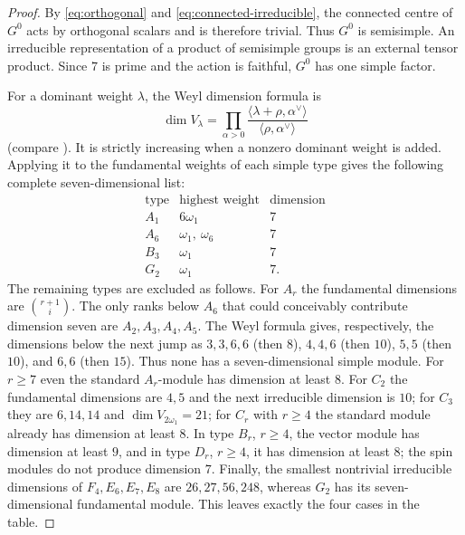 \begin{proof}
By \eqref{eq:orthogonal} and \eqref{eq:connected-irreducible}, the connected
centre of $G^0$ acts by orthogonal scalars and is therefore trivial.  Thus
$G^0$ is semisimple.  An irreducible representation of a product of
semisimple groups is an external tensor product.  Since $7$ is prime and the
action is faithful, $G^0$ has one simple factor.

For a dominant weight $\lambda$, the Weyl dimension formula is
\[
 \dim V_\lambda=
 \prod_{\alpha>0}
 \frac{\langle\lambda+\rho,\alpha^\vee\rangle}
      {\langle\rho,\alpha^\vee\rangle}
\]
(compare \cite[Lecture~24]{FultonHarris1991}).  It is strictly increasing when a nonzero
dominant weight is added.  Applying it to the fundamental weights of each
simple type gives the following complete seven-dimensional list:
\[
\begin{array}{c|c|c}
\text{type}&\text{highest weight}&\text{dimension}\\ \hline
A_1&6\omega_1&7\\
A_6&\omega_1,\ \omega_6&7\\
B_3&\omega_1&7\\
G_2&\omega_1&7.
\end{array}
\]
The remaining types are excluded as follows.  For $A_r$ the
fundamental dimensions are $\binom{r+1}{i}$.  The only ranks below $A_6$
that could conceivably contribute dimension seven are $A_2,A_3,A_4,A_5$.
The Weyl formula gives, respectively, the dimensions below the next jump as
$3,3,6,6$ (then $8$), $4,4,6$ (then $10$), $5,5$ (then $10$), and $6,6$
(then $15$).  Thus none has a seven-dimensional simple module.  For
$r\ge7$ even the standard $A_r$-module has dimension at least $8$.
For $C_2$ the fundamental dimensions are $4,5$ and the next irreducible
dimension is $10$; for $C_3$ they are $6,14,14$ and
$\dim V_{2\omega_1}=21$; for $C_r$ with $r\ge4$ the standard module
already has dimension at least $8$.  In type $B_r$, $r\ge4$, the vector
module has dimension at least $9$, and in type $D_r$, $r\ge4$, it has
dimension at least $8$; the spin modules do not produce dimension $7$.
Finally, the smallest nontrivial irreducible dimensions of
$F_4,E_6,E_7,E_8$ are $26,27,56,248$, whereas $G_2$ has its
seven-dimensional fundamental module.  This leaves exactly the four cases
in the table.


\end{proof}
